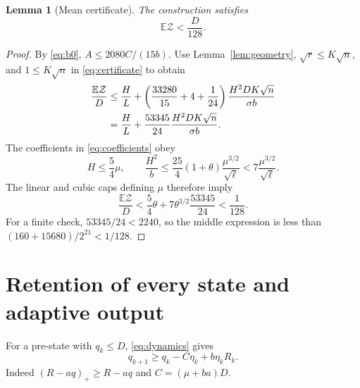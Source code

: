 \documentclass[11pt]{article}
\newtheorem{lemma}[theorem]{Lemma}
\theoremstyle{remark}
\newcommand{\E}{\mathbb E}
\begin{document}
\begin{lemma}[Mean certificate]\label{lem:mean-certificate}
The construction satisfies
\begin{equation}\label{eq:small-certificate}
 \E\mathcal Z<\frac D{128}.
\end{equation}
\end{lemma}
\begin{proof}
By \eqref{eq:b0}, $A\le2080C/(15b)$. Use
Lemma~\ref{lem:geometry}, $\sqrt r\le K\sqrt n$, and
$1\le K\sqrt n$ in \eqref{eq:certificate} to obtain
\begin{align}
 \frac{\E\mathcal Z}{D}
 &\le\frac HL+
   \left(\frac{33280}{15}+4+\frac1{24}\right)
             \frac{H^2DK\sqrt n}{\sigma b}\notag\\
 &=\frac HL+\frac{53345}{24}
             \frac{H^2DK\sqrt n}{\sigma b}.\label{eq:certificate-mean}
\end{align}
The coefficients in \eqref{eq:coefficients} obey
\begin{equation}\label{eq:H-b}
 H\le\frac54\mu,\qquad
 \frac{H^2}{b}\le\frac{25}{4}(1+\theta)
                     \frac{\mu^{3/2}}{\sqrt\ell}
                  <7\frac{\mu^{3/2}}{\sqrt\ell}.
\end{equation}
The linear and cubic caps defining $\mu$ therefore imply
\[
 \frac{\E\mathcal Z}{D}
 <\frac54\theta+7\theta^{3/2}\frac{53345}{24}<\frac1{128}.
\]
For a finite check, $53345/24<2240$, so the middle expression is
less than $(160+15680)/2^{21}<1/128$.
\end{proof}

\section{Retention of every state and adaptive output}

For a pre-state with $q_k\le D$, \eqref{eq:dynamics} gives
\begin{equation}\label{eq:slow-drop}
 q_{k+1}\ge q_k-C\eta_k+b\eta_kR_k.
\end{equation}
Indeed $(R-aq)_+\ge R-aq$ and $C=(\mu+ba)D$.
\end{document}
